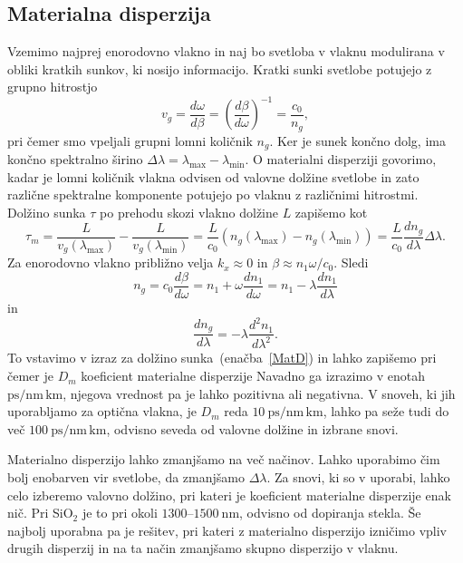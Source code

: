 \subsection*{Materialna disperzija}
Vzemimo najprej enorodovno vlakno in naj bo svetloba v vlaknu modulirana
v obliki kratkih sunkov, ki nosijo informacijo. Kratki sunki svetlobe
potujejo z grupno hitrostjo 
\begin{equation}
v_{g}=\frac{d\omega}{d\beta}=\left(\frac{d\beta}{d\omega}\right)^{-1} = \frac{c_0}{n_g},
\label{9.51}
\end{equation}
pri čemer smo vpeljali grupni lomni količnik $n_g$. Ker je sunek končno dolg, 
ima končno spektralno širino $\Delta \lambda=\lambda_{\mathrm{max}}-\lambda_{\mathrm{min}}
$. O materialni disperziji govorimo, kadar je lomni količnik vlakna odvisen od
valovne dolžine svetlobe in zato različne spektralne komponente potujejo po vlaknu z različnimi
hitrostmi. Dolžino sunka $\tau$ po prehodu skozi vlakno dolžine $L$ zapišemo kot
\begin{equation}
\tau_m = \frac{L}{v_g(\lambda_{\mathrm{max}})} - \frac{L}{v_g(\lambda_{\mathrm{min}})} = 
\frac{L}{c_0}\left(n_g(\lambda_{\mathrm{max}}) - n_g(\lambda_{\mathrm{min}}) \right) 
= \frac{L}{c_0}\frac{d n_g}{d \lambda}\Delta \lambda.
\label{MatD}
\end{equation}
Za enorodovno vlakno približno velja $k_x \approx 0$ in $\beta \approx n_1 \omega/c_0$. 
Sledi
\begin{equation}
n_g = c_0 \frac{d\beta}{d\omega} = n_1 + \omega \frac{d n_1}{d\omega} = n_1 - \lambda 
\frac{dn_1}{d\lambda}
\end{equation}
in
\begin{equation}
\frac{dn_g}{d\lambda} = -\lambda\frac{d^2n_1}{d\lambda^2}.
\end{equation}
To vstavimo v izraz za dolžino sunka~(enačba~\ref{MatD}) in lahko zapišemo
pri čemer je $D_m$ koeficient materialne disperzije
Navadno ga izrazimo v enotah $\si{\pico\second/\nano\meter\, \kilo\meter}$, 
njegova vrednost pa je lahko pozitivna ali negativna. 
V snoveh, ki jih uporabljamo za optična vlakna, je $D_m$ reda 
$10~\si{\pico\second/\nano\meter\, \kilo\meter}$, lahko pa seže
tudi do več $100~\si{\pico\second/\nano\meter\, \kilo\meter}$, odvisno seveda od valovne dolžine
in izbrane snovi. 

Materialno disperzijo lahko zmanjšamo na več načinov. Lahko uporabimo čim bolj enobarven
vir svetlobe, da zmanjšamo $\Delta \lambda$. Za snovi, ki so v uporabi, 
lahko celo izberemo valovno dolžino, pri kateri je koeficient materialne disperzije enak nič.
Pri SiO$_2$ je to pri okoli $1300$--$1500~\si{\nano\meter}$, odvisno od dopiranja stekla. 
Še najbolj uporabna
pa je rešitev, pri kateri z materialno disperzijo izničimo vpliv drugih disperzij in 
na ta način zmanjšamo skupno disperzijo v vlaknu.

